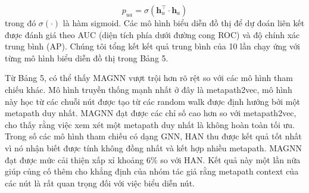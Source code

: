 \begin{equation}
  p_{u a}=\sigma\left(\mathbf{h}_{u}^{\top} \cdot \mathbf{h}_{a}\right)
\end{equation}
trong đó $\sigma(\cdot)$ là hàm sigmoid. Các mô hình biểu diễn đồ thị để dự đoán liên kết được đánh giá theo AUC (diện tích phía dưới đường cong ROC) và độ chính xác trung bình (AP). Chúng tôi tổng kết kết quả trung bình của 10 lần chạy ứng với từng mô hình biểu diễn đồ thị trong Bảng 5. 

Từ Bảng 5, có thể thấy MAGNN vượt trội hơn rõ rệt so với các mô hình tham chiếu khác. Mô hình truyền thống mạnh nhất ở đây là metapath2vec, mô hình này học từ các chuỗi nút được tạo từ các random walk được định hướng bởi một metapath duy nhất. MAGNN đạt được các chỉ số cao hơn so với metapath2vec, cho thấy rằng việc xem xét một metapath duy nhất là không hoàn toàn tối ưu. Trong số các mô hình tham chiếu có dạng GNN, HAN thu được kết quả tốt nhất vì nó nhận biết được tính không đồng nhất và kết hợp nhiều metapath. MAGNN đạt được mức cải thiện xấp xỉ khoảng $6 \%$ so với HAN. Kết quả này một lần nữa giúp củng cố thêm cho khẳng định của nhóm tác giả rằng  metapath context của các nút là rất quan trọng đối với việc biểu diễn nút.

